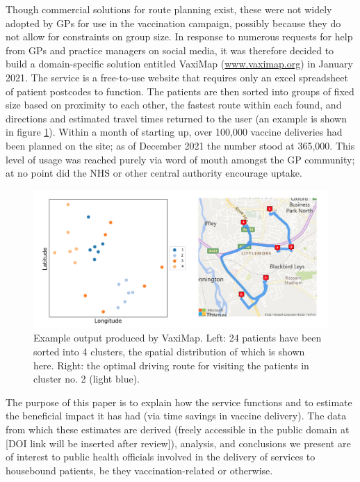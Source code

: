 \documentclass[review]{elsarticle}
\def\vm{VaxiMap}
\begin{document}
Though commercial solutions for route planning exist, these were not widely adopted by GPs for use in the vaccination campaign, possibly because they do not allow for constraints on group size. In response to numerous requests for help from GPs and practice managers on social media, it was therefore decided to build a domain-specific solution entitled \vm{} (\hyperlink{https://www.vaximap.org}{www.vaximap.org}) in January 2021. The service is a free-to-use website that requires only an excel spreadsheet of patient postcodes to function. The patients are then sorted into groups of fixed size based on proximity to each other, the fastest route within each found, and directions and estimated travel times returned to the user (an example is shown in figure \ref{demo}). Within a month of starting up, over 100,000 vaccine deliveries had been planned on the site; as of December 2021 the number stood at 365,000. This level of usage was reached purely via word of mouth amongst the GP community; at no point did the NHS or other central authority encourage uptake. 

\begin{figure}[htbp]
\centering
\includegraphics[width=\textwidth]{demo.png}
\caption{Example output produced by \vm{}. Left: 24 patients have been sorted into 4 clusters, the spatial distribution of which is shown here. Right: the optimal driving route for visiting the patients in cluster no. 2 (light blue).}
\label{demo}
\end{figure}

The purpose of this paper is to explain how the service functions and to estimate the beneficial impact it has had (via time savings in vaccine delivery). The data from which these estimates are derived (freely accessible in the public domain at [DOI link will be inserted after review]), analysis, and conclusions we present are of interest to public health officials involved in the delivery of services to housebound patients, be they vaccination-related or otherwise. 
\end{document}
